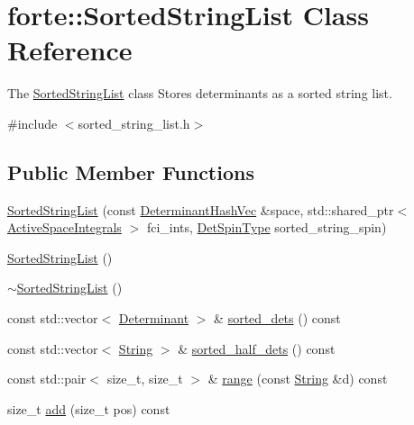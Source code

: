 \hypertarget{classforte_1_1_sorted_string_list}{}\section{forte\+:\+:Sorted\+String\+List Class Reference}
\label{classforte_1_1_sorted_string_list}


The \mbox{\hyperlink{classforte_1_1_sorted_string_list}{Sorted\+String\+List}} class Stores determinants as a sorted string list.  




{\ttfamily \#include $<$sorted\+\_\+string\+\_\+list.\+h$>$}

\subsection*{Public Member Functions}
\begin{DoxyCompactItemize}
\item 
\mbox{\hyperlink{classforte_1_1_sorted_string_list_aa6c7deb1dcd49cc0cb868ec81bb66a80}{Sorted\+String\+List}} (const \mbox{\hyperlink{classforte_1_1_determinant_hash_vec}{Determinant\+Hash\+Vec}} \&space, std\+::shared\+\_\+ptr$<$ \mbox{\hyperlink{classforte_1_1_active_space_integrals}{Active\+Space\+Integrals}} $>$ fci\+\_\+ints, \mbox{\hyperlink{namespaceforte_acb88fa63430aae4a1b15c7be9c55f179}{Det\+Spin\+Type}} sorted\+\_\+string\+\_\+spin)
\item 
\mbox{\hyperlink{classforte_1_1_sorted_string_list_a9e1f756811df1734ace863fe9edddb78}{Sorted\+String\+List}} ()
\item 
\mbox{\hyperlink{classforte_1_1_sorted_string_list_a5587d7d7bcf79b209a85f5dc144672d1}{$\sim$\+Sorted\+String\+List}} ()
\item 
const std\+::vector$<$ \mbox{\hyperlink{namespaceforte_a2076c63fd7b8732004d9e1442ce527c1}{Determinant}} $>$ \& \mbox{\hyperlink{classforte_1_1_sorted_string_list_a62557c1c45fec5ae4e833e7787a8aed5}{sorted\+\_\+dets}} () const
\item 
const std\+::vector$<$ \mbox{\hyperlink{namespaceforte_a840d1bfd3a8b3c16e09979212f37313f}{String}} $>$ \& \mbox{\hyperlink{classforte_1_1_sorted_string_list_adaf5d0b2351532d9d722e637909e5f93}{sorted\+\_\+half\+\_\+dets}} () const
\item 
const std\+::pair$<$ size\+\_\+t, size\+\_\+t $>$ \& \mbox{\hyperlink{classforte_1_1_sorted_string_list_ac46d5fa00476a9525b4cdbdcaa5aa4f8}{range}} (const \mbox{\hyperlink{namespaceforte_a840d1bfd3a8b3c16e09979212f37313f}{String}} \&d) const
\item 
size\+\_\+t \mbox{\hyperlink{classforte_1_1_sorted_string_list_af3ddb6fb4047bf4db17911b24c966f7f}{add}} (size\+\_\+t pos) const
\end{DoxyCompactItemize}

